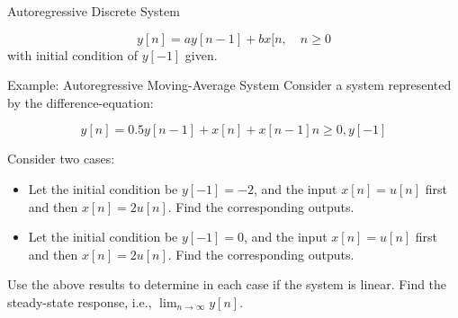 \documentclass[aspectratio=169,xcolor=dvipsnames,svgnames,x11names,fleqn]{beamer}
\begin{document}
\begin{frame}{Autoregressive Discrete System}

    $$
    y[n] = ay[n-1] + bx[n, \quad n \geq 0
    $$
    with initial condition of $y[-1]$ given.
\end{frame}

\begin{frame}{Example: Autoregressive Moving-Average System}
    Consider a system represented by the difference-equation:

    $$
    y[n] = 0.5y[n - 1] + x[n] + x[n - 1] n \geq 0, y[-1] 
    $$

    Consider two cases:
    \begin{itemize}
        \item Let the initial condition be $y[-1]=-2$, and the input $x[n] = u[n]$ first and then $x[n] = 2u[n]$. Find the corresponding outputs.
        \item Let the initial condition be $y[-1] = 0$, and the input $x[n] = u[n]$ first and then $x[n] = 2u[n]$. Find the corresponding outputs.
    \end{itemize}

Use the above results to determine in each case if the system is linear. Find the steady-state response,
i.e., $\lim_{n\to \infty} y[n]$.

\end{frame}

\begin{frame}{}
\vspace*{-9\baselineskip}
    \color{LightGray}{Blank space for calculation}
\end{frame}
\begin{frame}{}
\vspace*{-9\baselineskip}
    \color{LightGray}{Blank space for calculation}
\end{frame}
\begin{frame}{}
\vspace*{-9\baselineskip}
    \color{LightGray}{Blank space for calculation}
\end{frame}

\begin{frame}{}
\vspace*{-9\baselineskip}
    \color{LightGray}{Blank space for calculation}
\end{frame}
\begin{frame}{}
\vspace*{-9\baselineskip}
    \color{LightGray}{Blank space for calculation}
\end{frame}
\begin{frame}{}
\vspace*{-9\baselineskip}
    \color{LightGray}{Blank space for calculation}
\end{frame}
\end{document}
